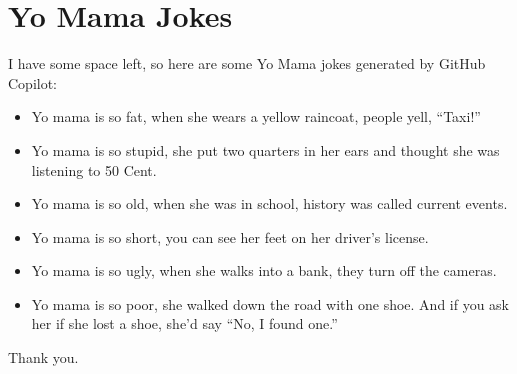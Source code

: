 \documentclass[11pt]{article}
\begin{document}
\section{Yo Mama Jokes}
\noindent I have some space left, so here are some Yo Mama jokes generated by GitHub Copilot:
\begin{itemize}
  \item Yo mama is so fat, when she wears a yellow raincoat, people yell, ``Taxi!''
  \item Yo mama is so stupid, she put two quarters in her ears and thought she was listening to 50 Cent.
  \item Yo mama is so old, when she was in school, history was called current events.
  \item Yo mama is so short, you can see her feet on her driver's license.
  \item Yo mama is so ugly, when she walks into a bank, they turn off the cameras.
  \item Yo mama is so poor, she walked down the road with one shoe. And if you ask her if she lost a shoe, she'd say ``No, I found one.''
\end{itemize}
Thank you.
\end{document}
